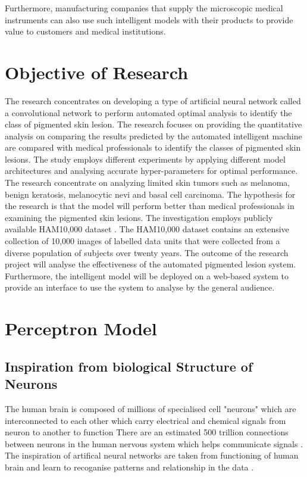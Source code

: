 Furthermore, manufacturing companies that supply the microscopic medical instruments can also use such intelligent models with their products to provide value to customers and medical institutions.

\section{Objective of Research}
The research concentrates on developing a type of artificial neural network called a convolutional network to perform automated optimal analysis to identify the class of pigmented skin lesion. 
The research focuses on providing the quantitative analysis on comparing the results predicted by the automated intelligent machine are compared with medical professionals to identify the classes of pigmented skin lesions. The study employs different experiments by applying different model architectures and analysing accurate hyper-parameters for optimal performance. 
The research concentrate on analyzing limited skin tumors such as melanoma, 
benign keratosis, melanocytic nevi and basal cell carcinoma. The hypothesis for the research is that the model will perform 
better than medical professionals in examining the pigmented skin lesions. The investigation employs publicly available HAM10,000 dataset \citep{DVN/DBW86T_2018}. 
The HAM10,000 dataset contains an extensive collection of 10,000 images of labelled data units that were collected from a diverse population of subjects over twenty years.
The outcome of the research project will analyse the effectiveness of the automated pigmented 
lesion system. Furthermore, the intelligent model will be deployed on a web-based system to provide an interface to use the system to analyse by the general audience.
\pagebreak
\pagebreak

\section{Perceptron Model}
\subsection{Inspiration from biological Structure of Neurons}
The human brain is composed of millions of specialised cell "neurons" which are interconnected to each other which carry electrical and chemical signals from neuron to another to function
There are an estimated 500 trillion connections between neurons in the human nervous system which helps communicate signals \citep{patterson2017deep}.
The inspiration of artifical neural networks are taken from functioning of human brain and learn to recoganise patterns and relationship in the data \citep{AGATONOVICKUSTRIN2000717}. 
